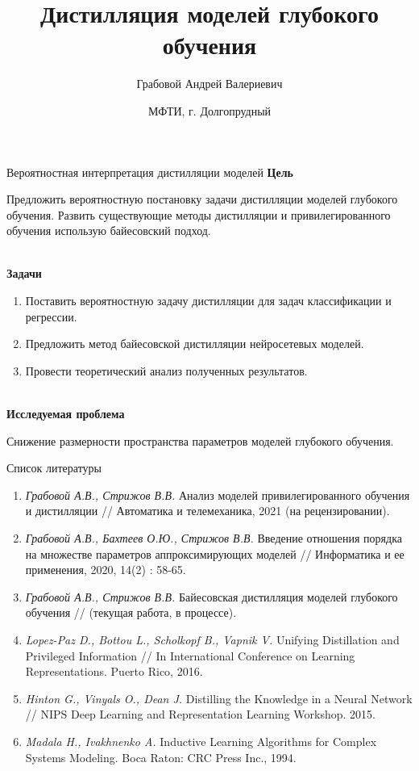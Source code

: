 \documentclass[10pt,pdf,hyperref={unicode}]{beamer}
\title[\hbox to 56mm{Дистилляция моделей глубокого обучения \hfill\insertframenumber\,/\,\inserttotalframenumber}]
{Дистилляция моделей глубокого обучения}
\author[А.\,В.~Грабовой]{\large Грабовой Андрей Валериевич}
\institute{\large
Московский физико-технический институт}
\date{\footnotesize{МФТИ, г. Долгопрудный}}
\begin{document}
\begin{frame}
\titlepage
\end{frame}

\begin{frame}{Вероятностная интерпретация дистилляции моделей}
\justifying
\textbf{Цель}

Предложить вероятностную постановку задачи дистилляции моделей глубокого обучения. Развить существующие методы дистилляции и привилегированного обучения использую байесовский подход.

~\\
\textbf{Задачи}

\begin{enumerate}
\justifying
	\item Поставить вероятностную задачу дистилляции для задач классификации и регрессии.
	\item Предложить метод байесовской дистилляции нейросетевых моделей.
	\item Провести теоретический анализ полученных результатов.
\end{enumerate}

~\\
\textbf{Исследуемая проблема}

Снижение размерности пространства параметров моделей глубокого обучения.

\end{frame}

\begin{frame}{Список литературы}
\justifying
\begin{enumerate}
	\item \textit{Грабовой А.В., Стрижов В.В.} Анализ моделей привилегированного обучения и дистилляции // Автоматика и телемеханика, 2021 (на рецензировании).
	\item \textit{Грабовой А.В., Бахтеев О.Ю., Стрижов В.В.} Введение отношения порядка на множестве параметров аппроксимирующих моделей // Информатика и ее применения, 2020, 14(2) : 58-65.
	\item \textit{Грабовой А.В., Стрижов В.В.} Байесовская дистилляция моделей глубокого обучения // (текущая работа, в процессе).
	\item \textit{Lopez-Paz D., Bottou L., Scholkopf B., Vapnik V.} Unifying Distillation and Privileged Information // In International Conference on Learning Representations. Puerto Rico, 2016.
	\item \textit{Hinton G., Vinyals O., Dean J.} Distilling the Knowledge in a Neural Network // NIPS Deep Learning and Representation Learning Workshop. 2015.
	\item \textit{Madala H., Ivakhnenko A.} Inductive Learning Algorithms for Complex Systems Modeling. Boca Raton: CRC Press Inc., 1994.
\end{enumerate}
\end{frame}
\end{document}
